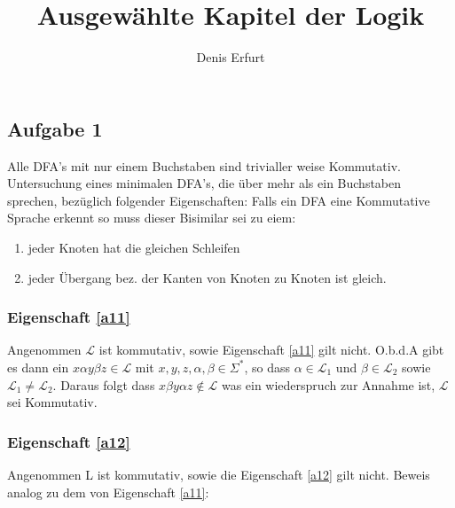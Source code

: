 \documentclass[12pt]{article}
\begin{document}
\title{Ausgewählte Kapitel der Logik}
\author{Denis Erfurt}
\maketitle



\subsection*{Aufgabe 1}
%


Alle DFA's mit nur einem Buchstaben sind trivialler weise Kommutativ.
Untersuchung eines minimalen DFA's, die über mehr als ein Buchstaben sprechen,
bezüglich folgender Eigenschaften:
Falls ein DFA eine Kommutative Sprache erkennt so muss dieser Bisimilar sei zu eiem:
\begin{enumerate}
  \item jeder Knoten hat die gleichen Schleifen \label{a11}
  \item jeder Übergang bez. der Kanten von Knoten zu Knoten ist gleich. \label{a12}
\end{enumerate}

\subsubsection*{Eigenschaft \ref{a11}}
Angenommen $\mathcal{L}$ ist kommutativ, sowie Eigenschaft \ref{a11} gilt nicht.
O.b.d.A gibt es dann ein $x\alpha y\beta z\in \mathcal{L}$ mit $x,y,z,\alpha, \beta\in\Sigma^*$, so dass $\alpha\in \mathcal{L}_1$ und $\beta\in \mathcal{L}_2$ sowie $\mathcal{L}_1\neq \mathcal{L}_2$. Daraus folgt dass $x\beta y\alpha z\notin \mathcal{L}$ was
ein wiederspruch zur Annahme ist, $\mathcal{L}$ sei Kommutativ.

\subsubsection*{Eigenschaft \ref{a12}}
Angenommen L ist kommutativ, sowie die Eigenschaft \ref{a12} gilt nicht.
Beweis analog zu dem von Eigenschaft \ref{a11}:
\end{document}

